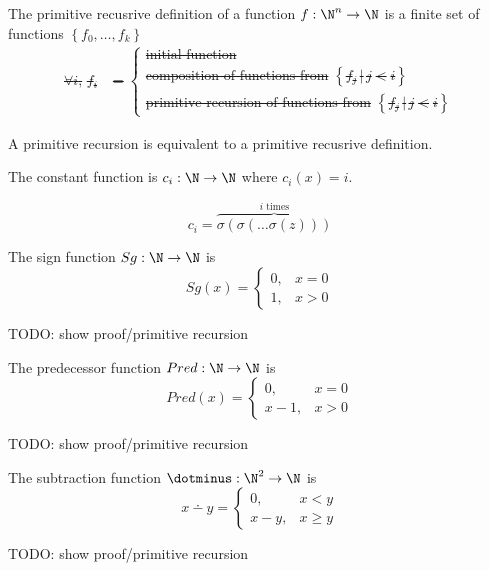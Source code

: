 \documentclass{article}
\begin{document}
\begin{definition}
    The primitive recusrive definition of a function
    \(f:\N^n\to\N\) is a finite set of functions \(\left\{f_0,\ldots,f_k\right\}\) \st
    \begin{align*}
        \forall i,\, f_i &= \begin{cases}
            \text{initial function} \\
            \text{composition of functions from } \left\{ f_j \,|\, j < i \right\} \\
            \text{primitive recursion of functions from } \left\{ f_j \,|\, j < i \right\}
        \end{cases} 
    \end{align*}
\end{definition}
\begin{theorem}
    A primitive recursion is equivalent to a primitive recusrive definition.
\end{theorem}
\begin{theorem}
    The constant function is \(c_i:\N\to\N\) where
    \(c_i(x)=i\).
    
    \[
        c_i=\overbrace{
            \sigma\left( \sigma\left(  \ldots \sigma\left( z \right) \right) \right)
        }^{i \text{ times}}
    \]
\end{theorem}
\begin{theorem}
    The sign function \(Sg:\N\to\N\) is
    \begin{equation*}
        Sg(x) = \begin{cases}
            0, & x = 0 \\
            1, & x > 0
        \end{cases}
    \end{equation*}

    TODO: show proof/primitive recursion
\end{theorem}
\begin{theorem}
    The predecessor function \(Pred:\N\to\N\) is
    \begin{equation*}
        Pred(x) = \begin{cases}
            0  , & x = 0 \\
            x-1, & x > 0
        \end{cases}
    \end{equation*}

    TODO: show proof/primitive recursion
\end{theorem}
\begin{theorem}
    The subtraction function \(\dotminus:\N^2\to\N\) is
    \begin{equation*}
        x\dotminus y = \begin{cases}
            0  , & x < y \\
            x-y, & x \ge y
        \end{cases}
    \end{equation*}

    TODO: show proof/primitive recursion
\end{theorem}
\end{document}
